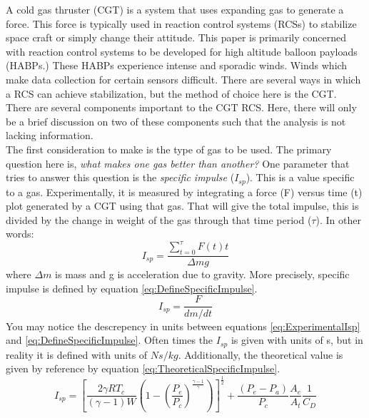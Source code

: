 A cold gas thruster (CGT) is a system that uses expanding gas to generate a force. This force is typically used in reaction control systems (RCSs) to stabilize space craft or simply change their attitude. This paper is primarily concerned with reaction control systems to be developed for high altitude balloon payloads (HABPs.) These HABPs experience intense and sporadic winds. Winds which make data collection for certain sensors difficult. There are several ways in which a RCS can achieve stabilization, but the method of choice here is the CGT.\\
There are several components important to the CGT RCS. Here, there will only be a brief discussion on two of these components such that the analysis is not lacking information. \\
The first consideration to make is the type of gas to be used. The primary question here is, \textit{what makes one gas better than another?} One parameter that tries to answer this question is the \textit{specific impulse} ($I_{sp}$). This is a value specific to a gas. Experimentally, it is measured by integrating a force (F) versus time (t) plot generated by a CGT using that gas. That will give the total impulse, this is divided by the change in weight of the gas through that time period ($\tau$). In other words:
\begin{equation}\label{eq:ExperimentalIsp}
I_{sp}=\frac{\sum\limits_{t=0}^{\tau} F(t)t}{\Delta mg}
\end{equation}%
%
%
%
%
%
where $\Delta m$ is mass and g is acceleration due to gravity. More precisely, specific impulse is defined by  equation \ref{eq:DefineSpecificImpulse}.
\begin{equation}\label{eq:DefineSpecificImpulse}
I_{sp}=\frac{F}{dm/dt}
\end{equation}
You may notice the descrepency in units between equations \ref{eq:ExperimentalIsp} and \ref{eq:DefineSpecificImpulse}. Often times the $I_{sp}$ is given with units of s, but in reality it is defined with units of $Ns/kg$. Additionally, the theoretical value is given by reference \cite{RocketPropulsion} by equation \ref{eq:TheoreticalSpecificImpulse}.
\begin{equation}\label{eq:TheoreticalSpecificImpulse}
I_{sp}=\left[\frac{2\gamma R T_c}{(\gamma-1)W}\left(1-\left(\frac{P_e}{P_c}\right)^{\frac{\gamma-1}{\gamma}}\right)\right]^{\frac{1}{2}}+\frac{(P_e-P_a)}{P_c}\frac{A_e}{A_t}\frac{1}{C_D}
\end{equation}
